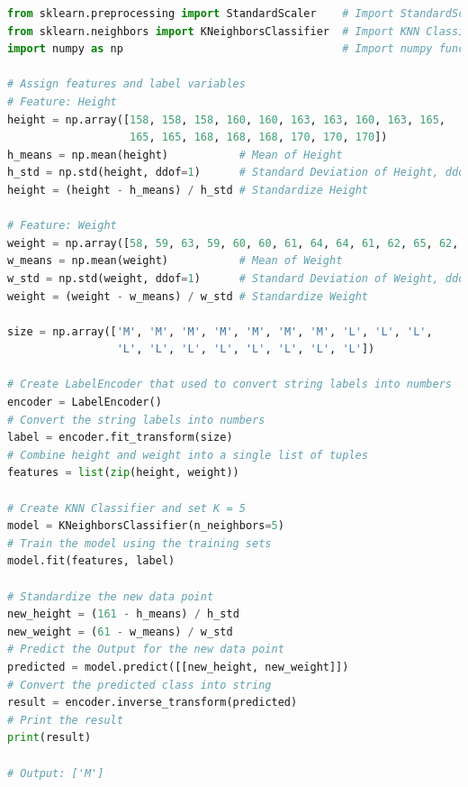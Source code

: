 \documentclass{book}
\begin{document}
\begin{lstlisting}[language=Python, basicstyle=\ttfamily\small, keywordstyle=\color{blue}, commentstyle=\color{forestgreen}, stringstyle=\color{red}]
from sklearn.preprocessing import StandardScaler    # Import StandardScaler functions
from sklearn.neighbors import KNeighborsClassifier  # Import KNN Classifier functions
import numpy as np                                  # Import numpy functions

# Assign features and label variables
# Feature: Height
height = np.array([158, 158, 158, 160, 160, 163, 163, 160, 163, 165,
                   165, 165, 168, 168, 168, 170, 170, 170])
h_means = np.mean(height)           # Mean of Height
h_std = np.std(height, ddof=1)      # Standard Deviation of Height, ddof=1 is to make the divisor N-1
height = (height - h_means) / h_std # Standardize Height

# Feature: Weight
weight = np.array([58, 59, 63, 59, 60, 60, 61, 64, 64, 61, 62, 65, 62, 63, 66, 63, 64, 68])
w_means = np.mean(weight)           # Mean of Weight
w_std = np.std(weight, ddof=1)      # Standard Deviation of Weight, ddof=1 is to make the divisor N-1
weight = (weight - w_means) / w_std # Standardize Weight

size = np.array(['M', 'M', 'M', 'M', 'M', 'M', 'M', 'L', 'L', 'L', 
                 'L', 'L', 'L', 'L', 'L', 'L', 'L', 'L'])

# Create LabelEncoder that used to convert string labels into numbers
encoder = LabelEncoder()
# Convert the string labels into numbers
label = encoder.fit_transform(size)
# Combine height and weight into a single list of tuples
features = list(zip(height, weight))

# Create KNN Classifier and set K = 5
model = KNeighborsClassifier(n_neighbors=5)
# Train the model using the training sets
model.fit(features, label)

# Standardize the new data point
new_height = (161 - h_means) / h_std
new_weight = (61 - w_means) / w_std
# Predict the Output for the new data point
predicted = model.predict([[new_height, new_weight]])
# Convert the predicted class into string
result = encoder.inverse_transform(predicted)
# Print the result
print(result)

# Output: ['M']
\end{lstlisting}
\newpage
\end{document}
